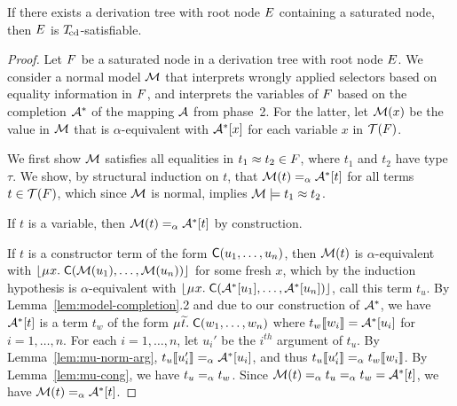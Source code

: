 \begin{theorem}%
\label{thm:ss}%
\afterDot
If there exists a derivation tree with root node $E$ containing a saturated node, then $E$ is $T_{\!\mathrm{cd}}$-satisfiable.
\end{theorem}
\begin{proof}
Let $F$ be a saturated node in a derivation tree with root node $E$.
We consider a normal model $\mathcal{M}$
that interprets wrongly applied selectors based on equality information in $F$,
and interprets the variables of $F$ based on the completion $\mathcal{A}^\ast$ of the mapping $\mathcal{A}$ from phase~2.
For the latter, let $\mathcal{M}( x )$ be the value in $\mathcal{M}$ that is $\alpha$-equivalent with $\mathcal{A}^\ast [x]$ for each variable $x$ in $\mathcal{T}(F)$.

We first show $\mathcal{M}$ satisfies all equalities in $t_1 \approx t_2 \in F$, where $t_1$ and $t_2$ have type $\tau$.
We show,
by structural induction on $t$,
that $\mathcal{M}( t ) \mathrel{=_\alpha} \mathcal{A}^\ast [t]$ for all terms $t \in \mathcal{T}( F )$,
which since $\mathcal{M}$ is normal, implies $\mathcal{M} \models t_1 \approx t_2$.

If $t$ is a variable, then $\mathcal{M}( t ) \mathrel{=_\alpha} \mathcal{A}^\ast [ t ]$ by construction.

If $t$ is a constructor term of the form $\textsf{C}( u_1, \ldots, u_n )$,
then $\mathcal{M}( t )$ is $\alpha$-equivalent with $\nf{\MU x.\; \const{C}( \M( u_1 ), \ldots, \M( u_n ) ) }$ for some fresh $x$,
which by the induction hypothesis is $\alpha$-equivalent with $\nf{\MU x.\; \const{C}( \Val^\ast \ec{ u_1 }, \ldots, \Val^\ast \ec{ u_n } )}$, call this term $t_u$.
By Lemma~\ref{lem:model-completion}.2 and due to our construction of $\mathcal{A}^\ast$, we have $\mathcal{A}^\ast [t]$ is a term
$t_w$ of the form $\MU {\Varec{t}}.\; \const{C}( w_1, \ldots, w_n )$
where $t_w\llbracket w_i \rrbracket = \mathcal{A}^\ast [u_i]$ for $i = 1, \ldots, n$.
For each $i = 1, \ldots, n$, let $u_i'$ be the $i^{th}$ argument of $t_u$.
By Lemma~\ref{lem:mu-norm-arg}, $t_u\llbracket u_i' \rrbracket \mathrel{=_\alpha} \mathcal{A}^\ast [u_i]$,
and thus $t_u\llbracket u_i' \rrbracket \mathrel{=_\alpha} t_w\llbracket  w_i  \rrbracket$. %
By Lemma~\ref{lem:mu-cong}, we have $t_u \mathrel{=_\alpha} t_w$.
Since $\mathcal{M}( t ) \mathrel{=_\alpha} t_u \mathrel{=_\alpha} t_w = \mathcal{A}^\ast [t]$,
we have $\mathcal{M}( t ) \mathrel{=_\alpha} \mathcal{A}^\ast [t]$.


\end{proof}
